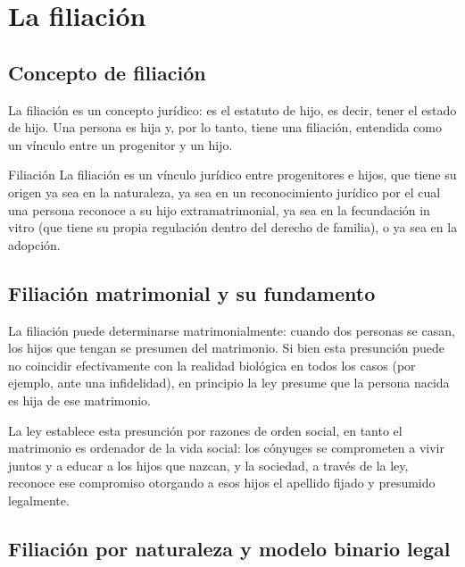 \documentclass[12pt,oneside]{book}
\begin{document}
\chapter{La filiación}

\section{Concepto de filiación}

La filiación es un concepto jurídico: es el estatuto de hijo, es decir, tener el estado de hijo. Una persona es hija y, por lo tanto, tiene una filiación, entendida como un vínculo entre un progenitor y un hijo.

\begin{definition}{Filiación}
La filiación es un vínculo jurídico entre progenitores e hijos, que tiene su origen ya sea en la naturaleza, ya sea en un reconocimiento jurídico por el cual una persona reconoce a su hijo extramatrimonial, ya sea en la fecundación in vitro (que tiene su propia regulación dentro del derecho de familia), o ya sea en la adopción.
\end{definition}

\section{Filiación matrimonial y su fundamento}

La filiación puede determinarse matrimonialmente: cuando dos personas se casan, los hijos que tengan se presumen del matrimonio. Si bien esta presunción puede no coincidir efectivamente con la realidad biológica en todos los casos (por ejemplo, ante una infidelidad), en principio la ley presume que la persona nacida es hija de ese matrimonio.

\begin{important}
La ley establece esta presunción por razones de orden social, en tanto el matrimonio es ordenador de la vida social: los cónyuges se comprometen a vivir juntos y a educar a los hijos que nazcan, y la sociedad, a través de la ley, reconoce ese compromiso otorgando a esos hijos el apellido fijado y presumido legalmente.
\end{important}

\section{Filiación por naturaleza y modelo binario legal}
\end{document}
